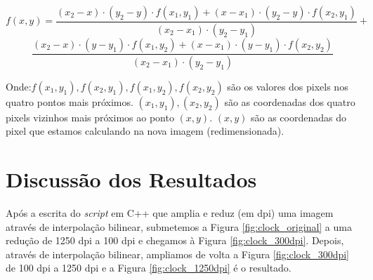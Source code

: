 \documentclass{article}
\begin{document}
\begin{equation}
f(x, y) = \frac{
    (x_2 - x) \cdot (y_2 - y) \cdot f(x_1, y_1) + 
    (x - x_1) \cdot (y_2 - y) \cdot f(x_2, y_1) 
}{(x_2 - x_1) \cdot (y_2 - y_1)} + 
\end{equation}
\[
\frac{
    (x_2 - x) \cdot (y - y_1) \cdot f(x_1, y_2) + 
    (x - x_1) \cdot (y - y_1) \cdot f(x_2, y_2)
}{(x_2 - x_1) \cdot (y_2 - y_1)}
\]

Onde:\( f(x_1, y_1), f(x_2, y_1), f(x_1, y_2), f(x_2, y_2) \) são os valores dos pixels nos quatro pontos mais próximos. \( (x_1, y_1), (x_2, y_2) \) são as coordenadas dos quatro pixels vizinhos mais próximos ao ponto \( (x, y) \).
\( (x, y) \) são as coordenadas do pixel que estamos calculando na nova imagem (redimensionada).

\section{Discussão dos Resultados}

Após a escrita do \textit{script} em C++ que amplia e reduz (em dpi) uma imagem através de interpolação bilinear, submetemos a Figura \ref{fig:clock_original}
a uma redução de 1250 dpi a 100 dpi e chegamos à Figura \ref{fig:clock_300dpi}. Depois, através de interpolação bilinear, ampliamos de volta a Figura \ref{fig:clock_300dpi}
de 100 dpi a 1250 dpi e a Figura \ref{fig:clock_1250dpi} é o resultado.
\end{document}
